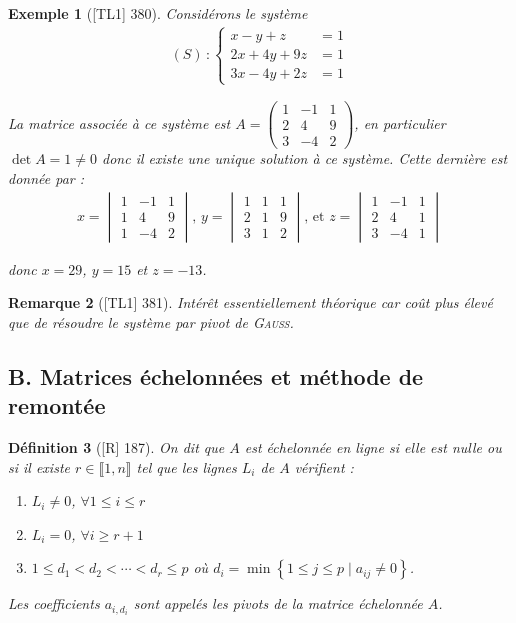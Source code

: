 \documentclass[10pt, a4paper, parskip=full, twoside, twocolumn]{report}
\newtheorem{definition}{Définition}
\newtheorem{example}[definition]{Exemple}
\newtheorem{remark}[definition]{Remarque}
\begin{document}
\begin{example}[\textnormal{[TL1] 380}]
	Considérons le système 
	\begin{align*}
		(S)\,\colon \begin{cases}
			x-y+z &= 1\\
			2x+4y+9z&=1\\
			3x-4y+2z &= 1
		\end{cases}
	\end{align*}

La matrice associée à ce système est $A = \begin{pmatrix}
	1 & -1 & 1 \\ 2 & 4 & 9 \\ 3 & -4 & 2
\end{pmatrix}$, en particulier $\det A = 1 \neq 0$ donc il existe une unique solution à ce système.
Cette dernière est donnée par :
\begin{align*}
	x = \begin{vmatrix}
		1 & -1 & 1 \\ 1 & 4 & 9 \\ 1 & -4 & 2
	\end{vmatrix},\, 
	y = \begin{vmatrix}
		1 & 1 & 1 \\ 2& 1 & 9 \\ 3 & 1 & 2
	\end{vmatrix},\,\text{et }
	z = \begin{vmatrix}
		1 & -1 & 1 \\ 2 & 4 & 1 \\ 3 & -4 & 1
	\end{vmatrix}
\end{align*}

donc $x = 29$, $y=15$ et $z=-13$.
\end{example}

\begin{remark}[\textnormal{[TL1] 381}]
	Intérêt essentiellement théorique car coût plus élevé que de résoudre le système par pivot de \textsc{Gauss}.
\end{remark}

\subsection*{B. Matrices échelonnées et méthode de remontée}
\begin{definition}[\textnormal{[R] 187}]
	On dit que $A$ est échelonnée en ligne si elle est nulle ou si il existe $r\in \llbracket 1,n \rrbracket$ tel que les lignes $L_i$ de $A$ vérifient :
	\begin{enumerate}
		\item $L_i\neq 0$, $\forall 1\leq i \leq r$
		\item $L_i = 0$, $\forall i\geq r+1$
		\item $1\leq d_1<d_2<\cdots<d_r\leq p$ où $d_i = \min\left\{1\leq j\leq p\mid a_{ij}\neq 0\right\}$.
	\end{enumerate}

	Les coefficients $a_{i,d_i}$ sont appelés les \emph{pivots} de la \emph{matrice échelonnée $A$}.
\end{definition}
\end{document}
